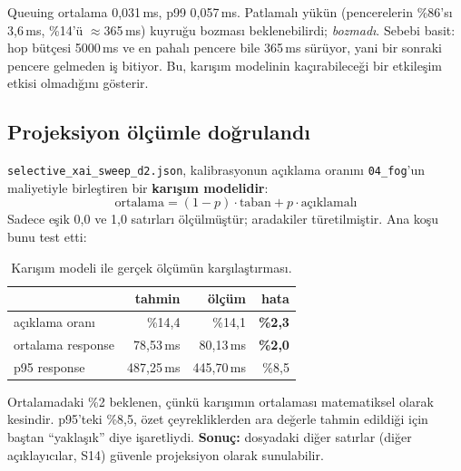 \documentclass[11pt,a4paper]{report}
\newcommand{\ms}{\,ms}
\newcommand{\dosya}[1]{\texttt{\footnotesize #1}}
\begin{document}
\begin{bulgu}
Queuing ortalama 0{,}031\ms, p99 0{,}057\ms. Patlamalı yükün (pencerelerin
\%86'sı 3{,}6\ms, \%14'ü $\approx$365\ms) kuyruğu bozması beklenebilirdi;
\emph{bozmadı}. Sebebi basit: hop bütçesi 5000\ms{} ve en pahalı pencere bile
365\ms{} sürüyor, yani bir sonraki pencere gelmeden iş bitiyor. Bu, karışım
modelinin kaçırabileceği bir etkileşim etkisi olmadığını gösterir.
\end{bulgu}

\subsection{Projeksiyon ölçümle doğrulandı}

\dosya{selective\_xai\_sweep\_d2.json}, kalibrasyonun açıklama oranını
\dosya{04\_fog}'un maliyetiyle birleştiren bir \textbf{karışım modelidir}:
\[
\text{ortalama} = (1-p)\cdot \text{taban} + p \cdot \text{açıklamalı}
\]
Sadece eşik 0{,}0 ve 1{,}0 satırları ölçülmüştür; aradakiler türetilmiştir.
Ana koşu bunu test etti:

\begin{table}[H]
\centering\small
\begin{tabular}{@{}lrrr@{}}
\toprule
& \textbf{tahmin} & \textbf{ölçüm} & \textbf{hata} \\
\midrule
açıklama oranı  & \%14{,}4 & \%14{,}1 & \textbf{\%2{,}3} \\
ortalama response & 78{,}53\ms & 80{,}13\ms & \textbf{\%2{,}0} \\
p95 response      & 487{,}25\ms & 445{,}70\ms & \%8{,}5 \\
\bottomrule
\end{tabular}
\caption{Karışım modeli ile gerçek ölçümün karşılaştırması.}
\end{table}

Ortalamadaki \%2 beklenen, çünkü karışımın ortalaması matematiksel olarak
kesindir. p95'teki \%8{,}5, özet çeyrekliklerden ara değerle tahmin edildiği
için baştan ``yaklaşık'' diye işaretliydi. \textbf{Sonuç:} dosyadaki diğer
satırlar (diğer açıklayıcılar, S14) güvenle projeksiyon olarak sunulabilir.
\end{document}
